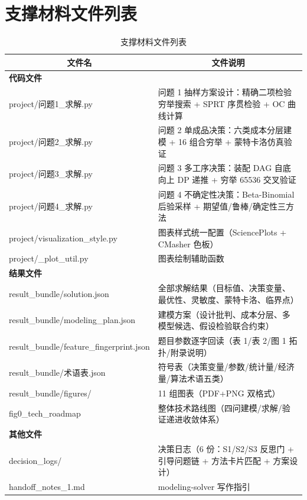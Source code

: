 \documentclass[12pt,a4paper]{ctexart}
\begin{document}
\appendix

\section{支撑材料文件列表}

\begin{table}[H]
\centering
\caption{支撑材料文件列表}
\label{tab:appendix_files}
\begin{tabular}{p{5cm}p{9cm}}
\toprule
\multicolumn{1}{c}{文件名} & \multicolumn{1}{c}{文件说明} \\
\midrule
\multicolumn{2}{l}{\textbf{代码文件}} \\
\midrule
project/问题1\_求解.py & 问题 1 抽样方案设计：精确二项检验穷举搜索 + SPRT 序贯检验 + OC 曲线计算 \\
project/问题2\_求解.py & 问题 2 单成品决策：六类成本分层建模 + 16 组合穷举 + 蒙特卡洛仿真验证 \\
project/问题3\_求解.py & 问题 3 多工序决策：装配 DAG 自底向上 DP 递推 + 穷举 65536 交叉验证 \\
project/问题4\_求解.py & 问题 4 不确定性决策：Beta-Binomial 后验采样 + 期望值/鲁棒/确定性三方法 \\
project/visualization\_style.py & 图表样式统一配置（SciencePlots + CMasher 色板） \\
project/\_plot\_util.py & 图表绘制辅助函数 \\
\midrule
\multicolumn{2}{l}{\textbf{结果文件}} \\
\midrule
result\_bundle/solution.json & 全部求解结果（目标值、决策变量、最优性、灵敏度、蒙特卡洛、临界点） \\
result\_bundle/modeling\_plan.json & 建模方案（设计批判、成本分层、多模型候选、假设检验联合约束） \\
result\_bundle/feature\_fingerprint.json & 题目参数逐字回读（表 1/表 2/图 1 拓扑/附录说明） \\
result\_bundle/术语表.json & 符号表（决策变量/参数/统计量/经济量/算法术语五类） \\
result\_bundle/figures/ & 11 组图表（PDF+PNG 双格式） \\
fig0\_tech\_roadmap & 整体技术路线图（四问建模/求解/验证递进收敛体系） \\
\midrule
\multicolumn{2}{l}{\textbf{其他文件}} \\
\midrule
decision\_logs/ & 决策日志（6 份：S1/S2/S3 反思门 + 引导问题链 + 方法卡片匹配 + 方案设计） \\
handoff\_notes\_1.md & modeling-solver 写作指引 \\
\bottomrule
\end{tabular}
\end{table}
\end{document}
